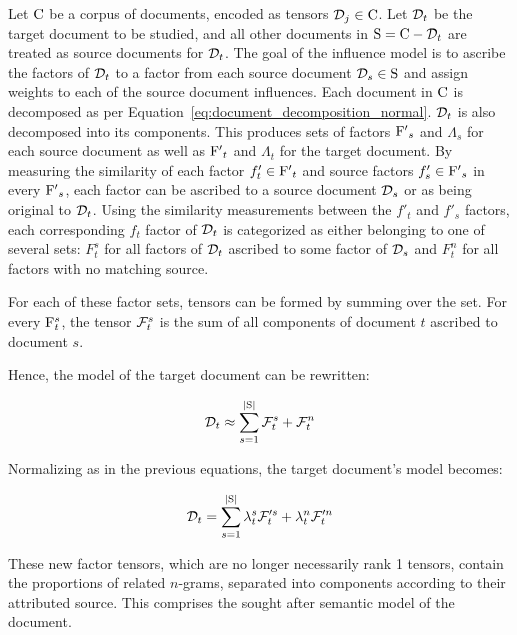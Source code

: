 \documentclass[../ut-dissertation.tex]{subfiles}
\begin{document}
Let $\mathrm{C}$ be a corpus of documents, encoded as tensors
$\mathcal{D}_j \in \mathrm{C}$.  Let $\mathcal{D}_t$ be the target document to
be studied, and all other documents in $\mathrm{S}=\mathrm{C} - \mathcal{D}_t$
are treated as source documents for $\mathcal{D}_t$.  The goal of the
influence model is to ascribe the factors of $\mathcal{D}_t$ to a factor
from each source document $\mathcal{D}_s\in \mathrm{S}$ and assign weights
to each of the source document influences. Each document in $\mathrm{C}$
is decomposed as per Equation~\ref{eq:document_decomposition_normal}.
$\mathcal{D}_t$ is also decomposed into its components.  This produces
sets of factors $\mathrm{F'}_s$ and $\Lambda_s$ for each source document
as well as $\mathrm{F'}_t$ and $\Lambda_t$ for the target document.  By
measuring the similarity of each factor $f'_{t}\in\mathrm{F'}_{t}$ and
source factors $f'_{s}\in \mathrm{F'}_s$ in every $\mathrm{F'}_s$, each
factor can be ascribed to a source document $\mathcal{D}_s$ or as being
original to $\mathcal{D}_t$.  Using the similarity measurements between
the $f'_t$ and $f'_s$ factors, each corresponding $f_t$ factor of
$\mathcal{D}_t$ is categorized as either belonging to one of several
sets: $F^s_t$ for all factors of $\mathcal{D}_t$ ascribed to some factor
of $\mathcal{D}_s$ and $F^n_t$ for all factors with no matching source.

For each of these factor sets, tensors can be formed by summing over
the set.  For every $\mathrm{F}^s_t$, the tensor $\mathcal{F}^s_t$ is the
sum of all components of document $t$ ascribed to document $s$.  

Hence, the model of the target document can be rewritten:

\begin{equation} \label{eq:influence_factors}
  \mathcal{D}_t \approx \sum_{s=1}^{|\mathrm{S}|} \mathcal{F}^s_t + \mathcal{F}^n_t
\end{equation}

Normalizing as in the previous equations, the target
document's model becomes:

\begin{equation} \label{eq:influence_factors_normalized}
  \mathcal{D}_t = \sum_{s=1}^{|\mathrm{S}|} \lambda^s_t \mathcal{F}'^s_t +
  \lambda^n_t \mathcal{F}'^n_t
\end{equation}

These new factor tensors, which are no longer necessarily rank 1
tensors, contain the proportions of related $n$-grams, separated into
components according to their attributed source.  This comprises the
sought after semantic model of the document.  
\end{document}
